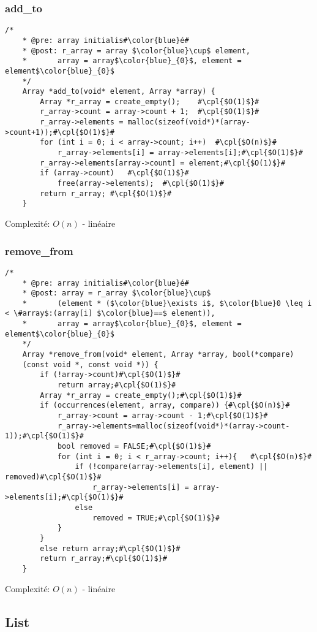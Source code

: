 \documentclass[a4paper, 11pt, oneside]{article}
\begin{document}
	\subsubsection{add\_to}
	\begin{lstlisting}[mathescape]
	/*
	* @pre: array initialis#\color{blue}é#
	* @post: r_array = array $\color{blue}\cup$ element,
	*		array = array$\color{blue}_{0}$, element = element$\color{blue}_{0}$
	*/
	Array *add_to(void* element, Array *array) {
		Array *r_array = create_empty();	#\cpl{$O(1)$}#
		r_array->count = array->count + 1;	#\cpl{$O(1)$}#
		r_array->elements = malloc(sizeof(void*)*(array->count+1));#\cpl{$O(1)$}#
		for (int i = 0; i < array->count; i++)	#\cpl{$O(n)$}#
			r_array->elements[i] = array->elements[i];#\cpl{$O(1)$}#
		r_array->elements[array->count] = element;#\cpl{$O(1)$}#
		if (array->count)	#\cpl{$O(1)$}#
			free(array->elements);	#\cpl{$O(1)$}#
		return r_array;	#\cpl{$O(1)$}#
	}
	\end{lstlisting}
	Complexité: $O(n)$ - linéaire
	\subsubsection{remove\_from}
	\begin{lstlisting}[mathescape]
	/*
	* @pre: array initialis#\color{blue}é#
	* @post: array = r_array $\color{blue}\cup$ 
	*		(element * ($\color{blue}\exists i$, $\color{blue}0 \leq i < \#array$:(array[i] $\color{blue}==$ element)),
	*		array = array$\color{blue}_{0}$, element = element$\color{blue}_{0}$
	*/
	Array *remove_from(void* element, Array *array, bool(*compare)    
	(const void *, const void *)) {
		if (!array->count)#\cpl{$O(1)$}#
			return array;#\cpl{$O(1)$}#
		Array *r_array = create_empty();#\cpl{$O(1)$}#
		if (occurrences(element, array, compare)) {#\cpl{$O(n)$}#
			r_array->count = array->count - 1;#\cpl{$O(1)$}#
			r_array->elements=malloc(sizeof(void*)*(array->count-1));#\cpl{$O(1)$}#
			bool removed = FALSE;#\cpl{$O(1)$}#
			for (int i = 0; i < r_array->count; i++){	#\cpl{$O(n)$}#
				if (!compare(array->elements[i], element) || removed)#\cpl{$O(1)$}#
					r_array->elements[i] = array->elements[i];#\cpl{$O(1)$}#
				else
					removed = TRUE;#\cpl{$O(1)$}#
			}
		}
		else return array;#\cpl{$O(1)$}#
		return r_array;#\cpl{$O(1)$}#
	}
	\end{lstlisting}
	Complexité: $O(n)$ - linéaire
	
	\clearpage
	\subsection{List}
	
\end{document}
